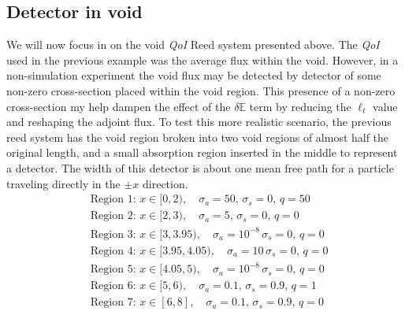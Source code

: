 \documentclass[12pt]{report}
\newcommand{\Edd}{\mathbb{E}}
\newcommand{\sigs}{\sigma_s}
\newcommand{\siga}{\sigma_a}
\newcommand{\isigt}{\ell_t}
\newcommand{\qoi}{{\it QoI}\xspace}
\begin{document}
\subsection{Detector in void}
We will now focus in on the void \qoi Reed system presented above. The \qoi used in the previous example was the average flux within the void. However, in a non-simulation experiment the void flux may be detected by detector of some non-zero cross-section placed within the void region. This presence of a non-zero cross-section my help dampen the effect of the $\delta \Edd$ term by reducing the $\isigt$ value and reshaping the adjoint flux. To  test this more realistic scenario, the previous reed system has the void region broken into two void regions of almost half the original length, and a small absorption region inserted in the middle to represent a detector. The width of this detector is about one mean free path for a particle traveling directly in the $\pm x$ direction.
\begin{equation*}
\begin{split}
&\text{Region 1: } x \in [0,2), \quad \siga=50, \, 			\sigs=0, \, q=50 \\
&\text{Region 2: } x \in [2,3), \quad \siga=5, \, 			\sigs=0, \, q=0 \\
&\text{Region 3: } x \in [3,3.95), \quad \siga=10^{-8} \,	\sigs=0, \, q=0 \\
&\text{Region 4: } x \in [3.95,4.05), \quad \siga=10 \,	\sigs=0, \, q=0 \\
&\text{Region 5: } x \in [4.05,5), \quad \siga=10^{-8} \,	\sigs=0, \, q=0 \\
&\text{Region 6: } x \in [5,6), \quad \siga=0.1, \, 		\sigs=0.9, \, q=1 \\
&\text{Region 7: } x \in [6,8], \quad \siga=0.1, \, 		\sigs=0.9, \, q=0\\
\end{split}
\end{equation*}
\end{document}
